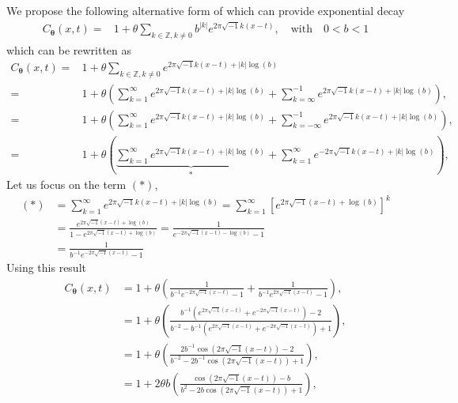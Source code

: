 \documentclass{iitthesis}          %
\newcommand{\bm}[1]{\boldsymbol{#1}}
\newcommand{\vtheta}{{\bm{\theta}}}
\def\abs#1{\ensuremath{\left \lvert #1 \right \rvert}}
\begin{document}
We propose the following alternative form of which can provide exponential decay
\begin{align*}
C_\vtheta(x, t) = & 1 + \theta \sum_{k \in \mathbb{Z}, k \neq 0 } b^{\abs{k}}  
e^{ 2 \pi\sqrt{-1} k (x-t)}, \quad \text{with} \quad 0 < b < 1
\end{align*}
which can be rewritten as
\begin{align*}
C_\vtheta(x, t) = & 1 + \theta \sum_{k \in \mathbb{Z}, k \neq 0 } 
e^{ 2 \pi\sqrt{-1} k (x-t) + \abs{k} \log(b)}
\\
=& 1 + \theta 
\left(
\sum_{k=1}^\infty e^{ 2 \pi\sqrt{-1} k (x-t) + \abs{k} \log(b)} 
+
\sum_{k=\infty}^{-1} e^{ 2 \pi\sqrt{-1} k (x-t) + \abs{k} \log(b)}
\right), 
\\
=& 1 + \theta 
\left(
\sum_{k=1}^\infty e^{ 2 \pi\sqrt{-1} k (x-t) + \abs{k} \log(b)} 
+
\sum_{k=-\infty}^{-1} e^{ 2 \pi\sqrt{-1} k (x-t) + \abs{k} \log(b)}
\right), 
\\
=& 1 + \theta 
\left(
\underbrace{
	\sum_{k=1}^\infty e^{ 2 \pi\sqrt{-1} k (x-t) + \abs{k} \log(b)} }_{*}
+
\sum_{k=1}^{\infty} e^{ -2 \pi\sqrt{-1} k (x-t) + \abs{k} \log(b)}
\right), 
\end{align*}
Let us focus on the term $(*)$,
\begin{align*}
(*) & = \sum_{k=1}^\infty e^{ 2 \pi\sqrt{-1} k (x-t) + \abs{k} \log(b)} =
\sum_{k=1}^\infty \left[e^{ 2 \pi\sqrt{-1} (x-t) +  \log(b)} \right]^k
\\
& = \frac{e^{ 2 \pi\sqrt{-1} (x-t) +  \log(b)}}{1- e^{ 2 \pi\sqrt{-1} (x-t) +  \log(b)}}
= \frac{1}{ e^{- 2 \pi\sqrt{-1} (x-t) -  \log(b)} -1 }
\\
& =\frac{1}{ b^{-1} e^{- 2 \pi\sqrt{-1} (x-t)} -1 }
\end{align*}
Using this result
\begin{align*}
C_\vtheta(x, t) &= 
1 + \theta 
\left(
\frac{1}{ b^{-1} e^{- 2 \pi\sqrt{-1} (x-t)} -1 }
+
\frac{1}{ b^{-1} e^{ 2 \pi\sqrt{-1} (x-t)} -1 }
\right),
\\
&= 
1 + \theta 
\left(
\frac{b^{-1} \left(e^{2 \pi\sqrt{-1} (x-t) }+ e^{ -2 \pi\sqrt{-1} (x-t)}\right) -2 }
{b^{-2} - b^{-1} \left(e^{ 2 \pi\sqrt{-1} (x-t)} + e^{ -2 \pi\sqrt{-1} (x-t)}\right) + 1 }
\right),
\\
&= 
1 + \theta 
\left(
\frac{2 b^{-1} \cos({2 \pi\sqrt{-1} (x-t) }) -2 }
{b^{-2} - 2 b^{-1} \cos({ 2 \pi\sqrt{-1} (x-t)})  + 1 }
\right),
\\
&= 
1 + 2 \theta b
\left(
\frac{ \cos({2 \pi\sqrt{-1} (x-t) }) - b }
{b^{2} - 2 b \cos({ 2 \pi\sqrt{-1} (x-t)})  + 1 }
\right),
\end{align*}
\end{document}
